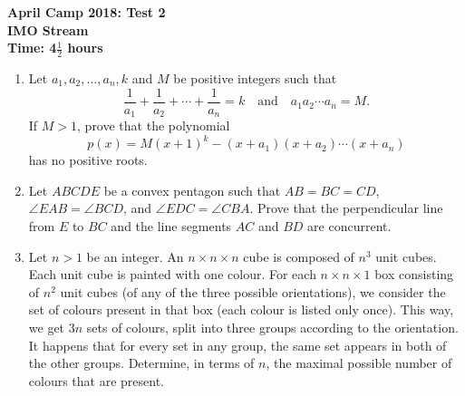 \documentclass[a4paper,12pt]{article}
\begin{document}
\setcounter{page}{1}

\begin{center}
	\textbf{April Camp 2018: Test 2}\\
	\textbf{IMO Stream}\\
	\textbf{Time: 4$\frac{1}{2}$ hours}
\end{center}

\begin{enumerate}
\vspace{0.2cm}

\item %
Let $a_1, a_2, \dotsc, a_n, k$ and $M$ be positive integers such that \[ \frac{1}{a_1} +\frac{1}{a_2} +\dotsb +\frac{1}{a_n} = k \quad\textrm{and}\quad a_1a_2\dotsb a_n = M.\]
If $M > 1$, prove that the polynomial \[p(x) = M(x+1)^k - (x+a_1)(x+a_2)\dotsb(x+a_n)\] has no positive roots.

\item %
Let $ABCDE$ be a convex pentagon such that $AB = BC = CD$, $\angle EAB =\angle BCD$, and $\angle EDC =\angle CBA$. Prove that the perpendicular line from $E$ to $BC$ and the line segments $AC$ and $BD$ are concurrent.


\item %
Let $n>1$ be an integer. An $n \times n \times n$ cube is composed of $n^3$ unit cubes. Each unit cube is painted with one colour. For each $n \times n \times 1$ box consisting of $n^2$ unit cubes (of any of the three possible orientations), we consider the set of colours present in that box (each colour is listed only once). This way, we get $3n$ sets of colours, split into three groups according to the orientation. It happens that for every set in any group, the same set appears in both of the other groups. Determine, in terms of $n$, the maximal possible number of colours that are present.

\end{enumerate}
\end{document}
